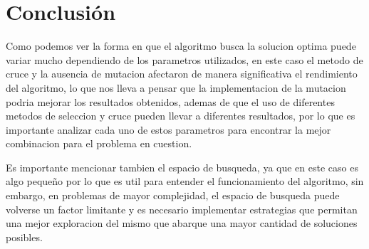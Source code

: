 \section{Conclusión}

Como podemos ver la forma en que el algoritmo busca la solucion optima puede variar mucho dependiendo de los parametros utilizados, en este caso
el metodo de cruce y la ausencia de mutacion afectaron de manera significativa el rendimiento del algoritmo, lo que nos lleva a pensar que
la implementacion de la mutacion podria mejorar los resultados obtenidos, ademas de que el uso de diferentes metodos de seleccion y cruce pueden llevar a
diferentes resultados, por lo que es importante analizar cada uno de estos parametros para encontrar la mejor combinacion para el problema en cuestion.

Es importante mencionar tambien el espacio de busqueda, ya que en este caso es algo pequeño por lo que es util para entender el funcionamiento
del algoritmo, sin embargo, en problemas de mayor complejidad, el espacio de busqueda puede volverse un factor limitante y es necesario
implementar estrategias que permitan una mejor exploracion del mismo que abarque una mayor cantidad de soluciones posibles.
